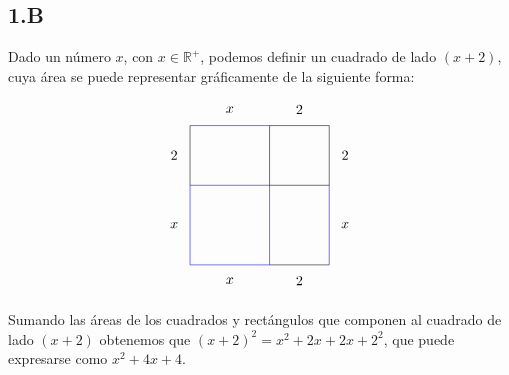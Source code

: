 \subsection*{1.B}

Dado un número $x$, con $x \in \mathbb{R^+}$, podemos definir un cuadrado de lado $(x+2)$, cuya área se puede representar gráficamente de la siguiente forma:

\begin{align*}
\begin{tikzpicture}
\draw[blue] (0,0) rectangle (2,2);
\draw (1, -0.4) node{$x$};
\draw (2,2) rectangle (3.5,3.5);
\draw (3.9, 2.75) node{$2$};
\draw (2,0) -- (3.5,0);
\draw (2.75, -0.4) node{$2$};
\draw[blue] (3.5, 0) -- (3.5, 2);
\draw (3.9, 1) node{$x$};
\draw[blue] (0, 3.5) -- (2, 3.5);
\draw (1, 3.9) node{$x$};
\draw (0, 2) -- (0, 3.5);
\draw (-0.4, 2.75) node{$2$};
\draw (2.75, 3.9) node{$2$};
\draw (-0.4, 1) node{$x$};
\end{tikzpicture}
\end{align*}

Sumando las áreas de los cuadrados y rectángulos que componen al cuadrado de lado $(x+2)$ obtenemos que $(x+2)^2 = x^2 + 2x + 2x + 2^2$, que puede expresarse como $x^2 + 4x +4$.
